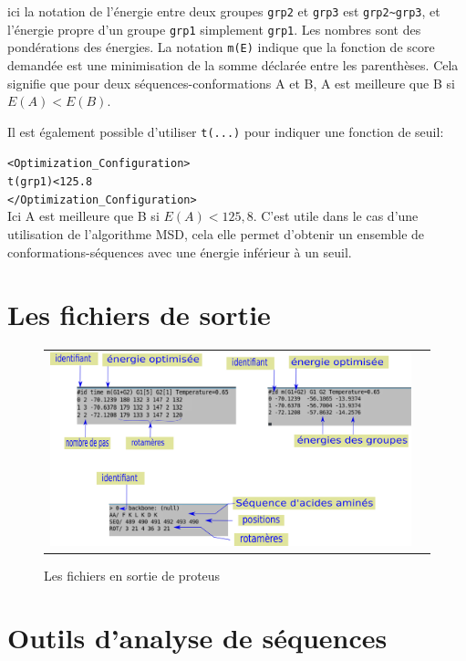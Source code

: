 \begin{enumerate}
ici la notation de l'énergie entre deux groupes \verb!grp2! et \verb!grp3! est \verb!grp2~grp3!, et  l'énergie propre d'un groupe \verb!grp1! simplement \verb!grp1!. Les nombres sont des pondérations des énergies. La notation \verb!m(E)! indique que la fonction de score demandée est une minimisation de la somme déclarée entre les parenthèses. Cela signifie que pour deux séquences-conformations A et B, A est meilleure que B si $E(A) < E(B)$.


Il est également possible d'utiliser \verb!t(...)! pour indiquer une fonction de seuil:

\verb!<Optimization_Configuration>! \\
\verb!t(grp1)<125.8! \\
\verb!</Optimization_Configuration>! \\

Ici A est meilleure que B si $E(A)<125,8$. C'est utile dans le cas d'une utilisation de l'algorithme MSD, cela elle permet d'obtenir un ensemble de conformations-séquences avec une énergie inférieur à un seuil.


\section{Les fichiers de sortie}
   
   \begin{figure}[!htbp]
     \centering
     \begin{tabular}{cc}
       \includegraphics[width=12cm]{figure/output.png} &
     \end{tabular}
     
     \caption{Les fichiers en sortie de proteus}
\label{graph:struct_Phy}
   \end{figure}
   


\section{Outils d'analyse de séquences} 

\end{enumerate}
